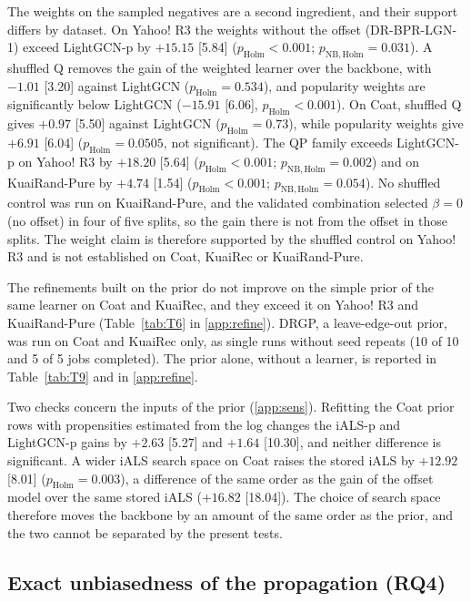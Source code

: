 

The weights on the sampled negatives are a second ingredient, and their support differs by dataset. On Yahoo! R3 the
weights without the offset (DR-BPR-LGN-1) exceed LightGCN-p by $+15.15$ [5.84] ($p_\mathrm{Holm}<0.001$;
$p_\mathrm{NB,Holm}=0.031$). A shuffled Q removes the gain of the weighted learner over the backbone, with $-1.01$ [3.20]
against LightGCN ($p_\mathrm{Holm}=0.534$), and popularity weights are significantly below LightGCN ($-15.91$ [6.06],
$p_\mathrm{Holm}<0.001$). On Coat, shuffled Q gives $+0.97$ [5.50] against LightGCN ($p_\mathrm{Holm}=0.73$), while
popularity weights give $+6.91$ [6.04] ($p_\mathrm{Holm}=0.0505$, not significant). The QP family exceeds LightGCN-p on
Yahoo! R3 by $+18.20$ [5.64] ($p_\mathrm{Holm}<0.001$; $p_\mathrm{NB,Holm}=0.002$) and on KuaiRand-Pure by $+4.74$ [1.54]
($p_\mathrm{Holm}<0.001$; $p_\mathrm{NB,Holm}=0.054$). No shuffled control was run on KuaiRand-Pure, and the validated
combination selected $\beta=0$ (no offset) in four of five splits, so the gain there is not from the offset in those
splits. The weight claim is therefore supported by the shuffled control on Yahoo! R3 and is not established on Coat,
KuaiRec or KuaiRand-Pure.

The refinements built on the prior do not improve on the simple prior of the same learner on Coat and KuaiRec, and they
exceed it on Yahoo! R3 and KuaiRand-Pure (Table~\ref{tab:T6} in \ref{app:refine}). DRGP, a leave-edge-out prior,
was run on Coat and KuaiRec only, as single runs without seed repeats (10 of 10 and 5 of 5 jobs completed). The prior
alone, without a learner, is reported in Table~\ref{tab:T9} and in \ref{app:refine}.

Two checks concern the inputs of the prior (\ref{app:sens}). Refitting the Coat prior rows with propensities
estimated from the log changes the iALS-p and LightGCN-p gains by $+2.63$ [5.27] and $+1.64$ [10.30], and neither
difference is significant. A wider iALS search space on Coat raises the stored iALS by $+12.92$ [8.01]
($p_\mathrm{Holm}=0.003$), a difference of the same order as the gain of the offset model over the same stored iALS
($+16.82$ [18.04]). The choice of search space therefore moves the backbone by an amount of the same order as the prior,
and the two cannot be separated by the present tests.

\subsection{Exact unbiasedness of the propagation (RQ4)}\label{sec:res-walk}

